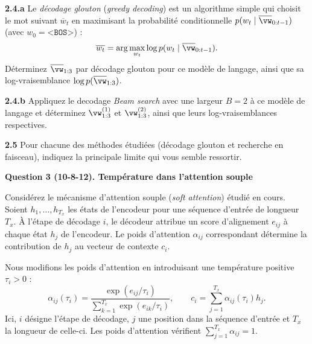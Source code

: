 \documentclass[12pt]{article}
\newif\ifsolution
\theoremstyle{definition}
\newcommand{\Answer}[1]{%
  \ifsolution
    {\color{answer}#1}%
  \fi
}
\newcommand{\question}[2]{\par\medskip\noindent\textbf{Question #1. #2}\par\medskip}
\newcommand{\bos}{\texttt{<BOS>}}
\begin{document}
\textbf{2.4.a} Le \textit{décodage glouton} (\textit{greedy decoding}) est un algorithme simple qui choisit le mot suivant $\overline{w}_t$ en maximisant la probabilité conditionnelle $p(w_t\mid \overline{\vw}_{0:t-1})$ (avec $w_0=\bos$) :
\[
\overline{w_t}=\arg\max_{w_t}\log p(w_t\mid \overline{\vw}_{0:t-1}).
\]
Déterminez $\overline{\vw}_{1:3}$ par décodage glouton pour ce modèle de langage, ainsi que sa log-vraisemblance $\log p(\overline{\vw}_{1:3})$.

\textbf{2.4.b} Appliquez le decodage \textit{Beam search}  avec une largeur $B=2$ à ce modèle de langage et déterminez $\vw_{1:3}^{(1)}$ et $\vw_{1:3}^{(2)}$, ainsi que leurs log-vraisemblances respectives.

\textbf{2.5} Pour chacune des méthodes étudiées (décodage glouton et recherche en faisceau), indiquez la principale limite qui vous semble ressortir.

\Answer{

}

\question{3 (10-8-12)}{Température dans l'attention souple}
Considérez le mécanisme d'attention souple (\textit{soft attention}) étudié en cours. Soient $h_1,\ldots,h_{T_x}$ les états de l'encodeur pour une séquence d'entrée de longueur $T_x$. À l'étape de décodage $i$, le décodeur attribue un score d'alignement $e_{ij}$ à chaque état $h_j$ de l'encodeur. Le poids d'attention $\alpha_{ij}$ correspondant détermine la contribution de $h_j$ au vecteur de contexte $c_i$.

Nous modifions les poids d'attention en introduisant une température positive $\tau_i>0$ :
\[
\alpha_{ij}(\tau_i)=\frac{\exp(e_{ij}/\tau_i)}{\sum_{k=1}^{T_x}\exp(e_{ik}/\tau_i)},\qquad c_i=\sum_{j=1}^{T_x}\alpha_{ij}(\tau_i)h_j.
\]
Ici, $i$ désigne l'étape de décodage, $j$ une position dans la séquence d'entrée et $T_x$ la longueur de celle-ci. Les poids d'attention vérifient $\sum_{j=1}^{T_x}\alpha_{ij}=1$.
\end{document}
